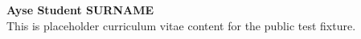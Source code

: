 \textbf{Ayse Student SURNAME}\\
This is placeholder curriculum vitae content for the public test fixture.
